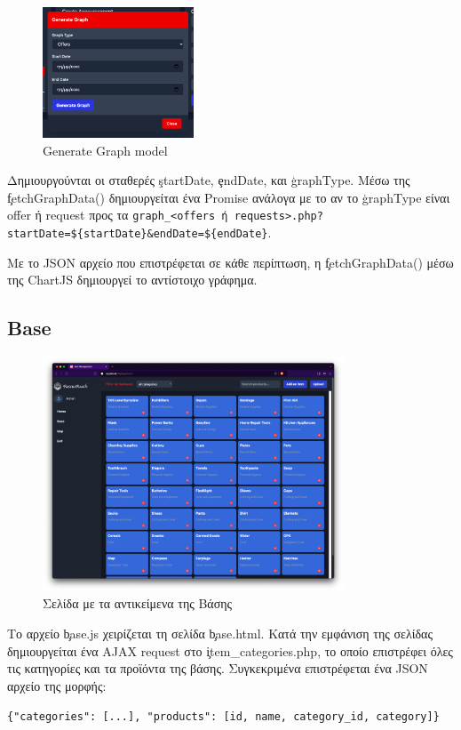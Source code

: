             \begin{figure}[H] \noindent \centering
                \includegraphics[width=0.4\textwidth]{img/admin-generate_graph}
                \caption{Generate Graph model}
            \end{figure}

            Δημιουργούνται οι σταθερές \c{startDate}, \c{endDate}, και \c{graphType}.
            Μέσω της \c{fetchGraphData()} δημιουργείται ένα Promise ανάλογα με το αν το \c{graphType} είναι offer ή request προς τα \verb|graph_<offers ή requests>.php?startDate=${startDate}&endDate=${endDate}|.

            Με το JSON αρχείο που επιστρέφεται σε κάθε περίπτωση, η \c{fetchGraphData()} μέσω της ChartJS δημιουργεί το αντίστοιχο γράφημα.

    \subsection{Base}

        \begin{figure}[H] \noindent \centering
            \includegraphics[width=0.8\textwidth]{img/admin-base}
            \caption{Σελίδα με τα αντικείμενα της Βάσης}
        \end{figure}

        Το αρχείο \c{base.js} χειρίζεται τη σελίδα \c{base.html}.
        Κατά την εμφάνιση της σελίδας δημιουργείται ένα AJAX request στο \c{item\_categories.php}, το οποίο επιστρέφει όλες τις κατηγορίες και τα προϊόντα της βάσης.
        Συγκεκριμένα επιστρέφεται ένα JSON αρχείο της μορφής:

        \begin{graycomment}
            \verb|{"categories": [...], "products": [id, name, category_id, category]}|
        \end{graycomment}


